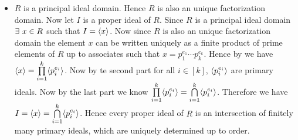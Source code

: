 \documentclass[a4paper, 11pt]{article}
\begin{document}
{\begin{itemize}[label=$\bullet$]
	Let $a\in \bigcap \limits_{i=1}^n \la p_i^{m_i}\ra$. Then $\exs \ r_i\in R$ such that $a=r_ip_i^{m_i}$. Now  $$r_1p_1^{m_1}=r_2p_2^{m_2}\implies p_1\mid r_2p_2^{m_2},p_2\mid r_1p_1^{m_1}\implies p_1\mid p_2\text{ or }p_1\mid r_2\text{ and }p_2\mid p_1\text{ or }p_2\mid r_1$$Since $p_1$ and $p_2$ are not associates we have $p_1\mid r_2$ and $p_2\mid r_1$. Since $p_1\nmid p_2$ and $p_2\nmid p_1$ we have $p_1^{m_1}\mid r_2$ and $p_2^{m_2}\mid r_1$. So let $r_1=p_2^{m_2}r_1^{(2)}$ where $r^{(1)}\in R$. Then $a=p_1^{m_1}p_2^{m_2}r_1^{(2)}$. Now suppose we have $a=r_1^{(i)}\prod\limits_{j=1}^i p_j^{m_j}$ where $r_1^{(i)}\in R$. Now $a=p_{i+1}^{m_{i+1}}r_{i+1}$. Therefore $$r_1^{(i)}\prod\limits_{j=1}^i p_j^{m_j}=p_{i+1}^{m_{i+1}}r_{i+1}\implies p_{i+1}^{m_{i+1}}\mid r_1^{(i)}\prod\limits_{j=1}^i p_j^{m_j}\implies p_{i+1}\mid r_1^{(i)}\text{ or }\exs\ j\in [i],\ p_{i+1}\mid p_j^{m_j}$$But $p_{i+1}$ and $p_j$ for all $j\in[i]$ are not associates. Therefore $p_{i+1}\nmid p_j^{m_j}$ for all $j\in[i]$. Hence $p_{i+1}\mid r_1^{(i)}$. Therefore $p_{i+1}^{m_{i+1}}\mid r_1^{(i)}$. Hence suppose $r_{1}^{(i)}=p_{i+1}^{m_{i+1}}r_1^{(i+1)}$ where $r_1^{(i+1)}\in R$. Therefore $a=r_1^{(i+1)}\prod\limits_{j=1}^{i+1}p_j^{m_j}$. Therefore for $i=n$ we get $a=r_1^{(n)}\prod\limits_{j=1}^n p_j^{m_j}$. Denote $r\coloneqq r_1^{(n)}$. Then $a=r\prod\limits_{i=1}^n p_i^{m_i}$.  Now $rp_1^{m_1}\in \la p_1^{m_1}$ and for all $i\in\{2,\dots, n\} $ we have $p_i^{m_i}\in \la p_i^{m_i}\ra$. Therefore $a=r_1^{(n)}\prod\limits_{j=1}^n p_j^{m_j}\in \prod\limits_{i=1}^n \la p_i^{m_i}\ra$. Hence $\bigcap\limits_{i=1}^n \la p_i^{m_i}\ra \subseteq \prod\limits_{i=1}^n \la p_i^{m_i}\ra$. Therefore we have $\bigcap\limits_{i=1}^n \la p_i^{m_i}\ra = \prod\limits_{i=1}^n \la p_i^{m_i}\ra$
\item $R$ is a principal ideal domain. Hence $R$ is also an unique factorization domain. Now let $I$ is a proper ideal of $R$. Since $R$ is a principal ideal domain $\exists\ x\in R$ such that $I=\langle x\rangle$. Now since $R$ is also an unique factorization domain the element $x$ can be written uniquely as a finite product of prime elements of $R$ up to associates such that   $ x =  p_1^{e_1}\cdots  p_k ^{e_k}$. Hence by  we have $\langle x\rangle =\prod\limits_{i=1}^k \langle p_i^{e_i}\rangle$. Now by te second part for all $i\in[k]$, $\langle p_i^{e_i}\rangle$ are primary ideals. Now by the last part we know $\prod\limits_{i=1}^k \langle p_i^{e_i}\rangle=\bigcap\limits_{i=1}^k \langle p_i^{e_i}\rangle$. Therefore we have $I=\langle x\rangle= \bigcap\limits_{i=1}^k \langle p_i^{e_i}\rangle$. Hence every proper ideal of $R$ is an intersection of finitely many primary ideals, which are uniquely determined up to order.
\end{itemize}

}\parinf
\end{document}
